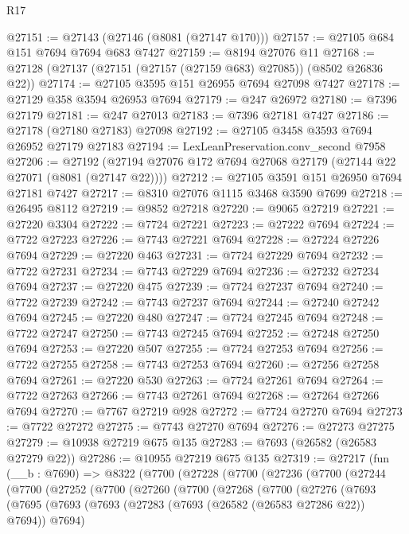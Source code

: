 \begin{lexlean}{R17}
\begin{coremodule}
@27151 := @27143 (@27146 (@8081 (@27147 @170)))
@27157 := @27105 @684 @151 @7694 @7694 @683 @7427
@27159 := @8194 @27076 @11
@27168 := @27128 (@27137 (@27151 (@27157 (@27159 @683) @27085)) (@8502 @26836 @22))
@27174 := @27105 @3595 @151 @26955 @7694 @27098 @7427
@27178 := @27129 @358 @3594 @26953 @7694
@27179 := @247 @26972
@27180 := @7396 @27179
@27181 := @247 @27013
@27183 := @7396 @27181 @7427
@27186 := @27178 (@27180 @27183) @27098
@27192 := @27105 @3458 @3593 @7694 @26952 @27179 @27183
@27194 := LexLeanPreservation.conv_second @7958
@27206 := @27192 (@27194 @27076 @172 @7694 @27068 @27179 (@27144 @22 @27071 (@8081 (@27147 @22))))
@27212 := @27105 @3591 @151 @26950 @7694 @27181 @7427
@27217 := @8310 @27076 @1115 @3468 @3590 @7699
@27218 := @26495 @8112
@27219 := @9852 @27218
@27220 := @9065 @27219
@27221 := @27220 @3304
@27222 := @7724 @27221
@27223 := @27222 @7694
@27224 := @7722 @27223
@27226 := @7743 @27221 @7694
@27228 := @27224 @27226 @7694
@27229 := @27220 @463
@27231 := @7724 @27229 @7694
@27232 := @7722 @27231
@27234 := @7743 @27229 @7694
@27236 := @27232 @27234 @7694
@27237 := @27220 @475
@27239 := @7724 @27237 @7694
@27240 := @7722 @27239
@27242 := @7743 @27237 @7694
@27244 := @27240 @27242 @7694
@27245 := @27220 @480
@27247 := @7724 @27245 @7694
@27248 := @7722 @27247
@27250 := @7743 @27245 @7694
@27252 := @27248 @27250 @7694
@27253 := @27220 @507
@27255 := @7724 @27253 @7694
@27256 := @7722 @27255
@27258 := @7743 @27253 @7694
@27260 := @27256 @27258 @7694
@27261 := @27220 @530
@27263 := @7724 @27261 @7694
@27264 := @7722 @27263
@27266 := @7743 @27261 @7694
@27268 := @27264 @27266 @7694
@27270 := @7767 @27219 @928
@27272 := @7724 @27270 @7694
@27273 := @7722 @27272
@27275 := @7743 @27270 @7694
@27276 := @27273 @27275
@27279 := @10938 @27219 @675 @135
@27283 := @7693 (@26582 (@26583 @27279 @22))
@27286 := @10955 @27219 @675 @135
@27319 := @27217
    (fun (__b : @7690) =>
    @8322
      (@7700
        (@27228
          (@7700
            (@27236
              (@7700
                (@27244
                  (@7700
                    (@27252
                      (@7700
                        (@27260
                          (@7700
                            (@27268
                              (@7700
                                (@27276
                                  (@7693
                                    (@7695
                                      (@7693
                                        (@7693
                                          (@27283 (@7693 (@26582 (@26583 @27286 @22)) @7694))
                                          @7694)

\end{coremodule}
\end{lexlean}
